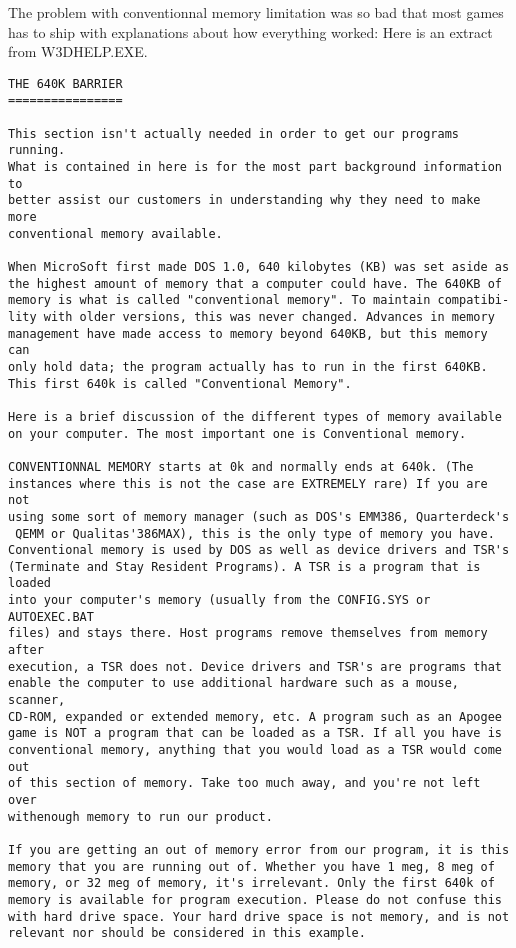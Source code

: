 \documentclass[book.tex]{subfiles}
\begin{document}
The problem with conventionnal memory limitation was so bad that most games has to ship with explanations about how everything worked: Here is an extract from W3DHELP.EXE.\\

 \begin{breakable_box}
   \begin{verbatim}
THE 640K BARRIER
================

This section isn't actually needed in order to get our programs running.
What is contained in here is for the most part background information to
better assist our customers in understanding why they need to make more
conventional memory available.

When MicroSoft first made DOS 1.0, 640 kilobytes (KB) was set aside as
the highest amount of memory that a computer could have. The 640KB of
memory is what is called "conventional memory". To maintain compatibi-
lity with older versions, this was never changed. Advances in memory 
management have made access to memory beyond 640KB, but this memory can
only hold data; the program actually has to run in the first 640KB. 
This first 640k is called "Conventional Memory".

Here is a brief discussion of the different types of memory available
on your computer. The most important one is Conventional memory.

CONVENTIONNAL MEMORY starts at 0k and normally ends at 640k. (The 
instances where this is not the case are EXTREMELY rare) If you are not
using some sort of memory manager (such as DOS's EMM386, Quarterdeck's
 QEMM or Qualitas'386MAX), this is the only type of memory you have.
Conventional memory is used by DOS as well as device drivers and TSR's
(Terminate and Stay Resident Programs). A TSR is a program that is loaded
into your computer's memory (usually from the CONFIG.SYS or AUTOEXEC.BAT
files) and stays there. Host programs remove themselves from memory after
execution, a TSR does not. Device drivers and TSR's are programs that
enable the computer to use additional hardware such as a mouse, scanner,
CD-ROM, expanded or extended memory, etc. A program such as an Apogee 
game is NOT a program that can be loaded as a TSR. If all you have is
conventional memory, anything that you would load as a TSR would come out
of this section of memory. Take too much away, and you're not left over
withenough memory to run our product. 

If you are getting an out of memory error from our program, it is this
memory that you are running out of. Whether you have 1 meg, 8 meg of
memory, or 32 meg of memory, it's irrelevant. Only the first 640k of
memory is available for program execution. Please do not confuse this
with hard drive space. Your hard drive space is not memory, and is not
relevant nor should be considered in this example.


\end{verbatim}
\end{breakable_box}
\end{document}
